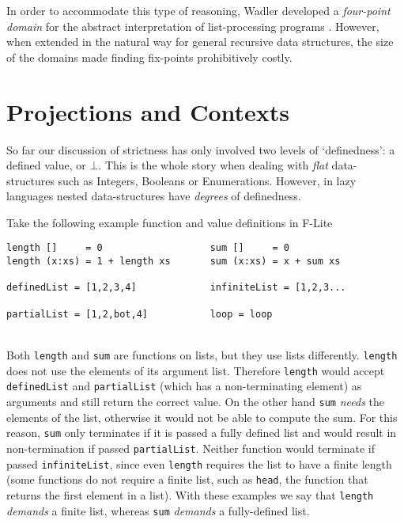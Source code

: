 In order to accommodate this type of reasoning, Wadler developed a
\emph{four-point domain} for the abstract interpretation of list-processing
programs \citep{wadler1987strictness}. However, when extended in the natural way
for general recursive data structures, the size of the domains made finding
fix-points prohibitively costly.

\section{Projections and Contexts}
\label{sec:projections}

So far our discussion of strictness has only involved two levels of
`definedness': a defined value, or $\bot$. This is the whole story when dealing
with \emph{flat} data-structures such as Integers, Booleans or Enumerations.
However, in lazy languages nested data-structures have \emph{degrees} of
definedness.

Take the following example function and value definitions in F-Lite

\begin{centering}
\begin{BVerbatim}
length []     = 0                   sum []     = 0
length (x:xs) = 1 + length xs       sum (x:xs) = x + sum xs

definedList = [1,2,3,4]             infiniteList = [1,2,3...

partialList = [1,2,bot,4]           loop = loop
\end{BVerbatim}
\end{centering}\\

Both \verb-length- and \verb-sum- are functions on lists, but they use lists
differently. \verb-length- does not use the elements of its argument list.
Therefore \verb-length- would accept \verb-definedList- and \verb-partialList-
(which has a non-terminating element) as arguments and still return the correct
value. On the other hand \verb-sum- \emph{needs} the elements of the list,
otherwise it would not be able to compute the sum. For this reason, \verb-sum-
only terminates if it is passed a fully defined list and would result in
non-termination if passed \verb-partialList-. Neither function would terminate
if passed \verb-infiniteList-, since even \verb-length- requires the list to
have a finite length (some functions do not require a finite list, such as
\verb-head-, the function that returns the first element in a list). With
these examples we say that \verb-length- \emph{demands} a finite list, whereas
\verb-sum- \emph{demands} a fully-defined list.

